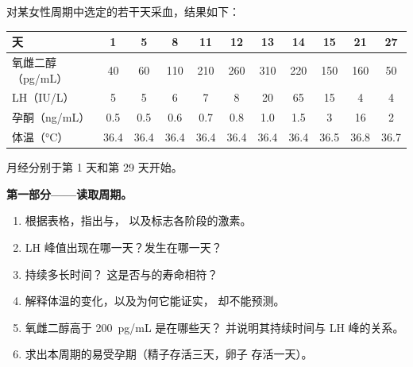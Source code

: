 \begin{problem}
\label{pb:b2:reproductive-hormones:1}
对某女性周期中选定的若干天采血，结果如下：

\begin{center}
\small
\begin{tabular}{lcccccccccc}
\hline
天 & 1 & 5 & 8 & 11 & 12 & 13 & 14 & 15 & 21 & 27 \\
\hline
氧雌二醇（\unit{pg/mL}） & 40 & 60 & 110 & 210 & 260 & 310 & 220 & 150 & 160 & 50 \\
LH（\unit{IU/L}） & 5 & 5 & 6 & 7 & 8 & 20 & 65 & 15 & 4 & 4 \\
孕酮（\unit{ng/mL}） & 0.5 & 0.5 & 0.6 & 0.7 & 0.8 & 1.0 & 1.5 & 3 & 16 & 2 \\
体温（\unit{\celsius}） & 36.4 & 36.4 & 36.4 & 36.4 & 36.4 & 36.4 & 36.4 & 36.5 & 36.8 & 36.7 \\
\hline
\end{tabular}
\end{center}

月经分别于第 1 天和第 29 天开始。

\medskip
\noindent\textbf{第一部分——读取周期。}
\begin{enumerate}
  \item 根据表格，指出与，
        以及标志各阶段的激素。
  \item LH 峰值出现在哪一天？发生在哪一天？
  \item {}持续多长时间？
        这是否与的寿命相符？
  \item 解释体温的变化，以及为何它能证实，
        却不能预测。
  \item 氧雌二醇高于 \qty{200}{pg/mL} 是在哪些天？
        并说明其持续时间与 LH 峰的关系。
  \item 求出本周期的易受孕期（精子存活三天，卵子
        存活一天）。
\end{enumerate}


\end{problem}
